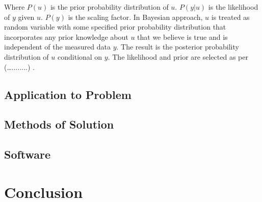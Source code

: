 \documentclass[10pt]{ubthesis}
\begin{document}
 \bigskip
 
\noindent Where $P(u)$ is the prior probability distribution of $u$. $P(y|u)$ is the likelihood of $y$ given $u$. $P(y)$ is the scaling factor. 
 \noindent In Bayesian approach, $u$ is treated as random variable with some specified prior probability distribution that incorporates any prior knowledge about $u$ that we believe is true and is independent of the measured data $y$. The result is the posterior probability distribution of $u$ conditional on $y$. The likelihood and prior are selected as per (…........) .

\section{Application to Problem}
\section{Methods of Solution}
\section{Software}






\chapter{Conclusion}
%
%
\end{document}
